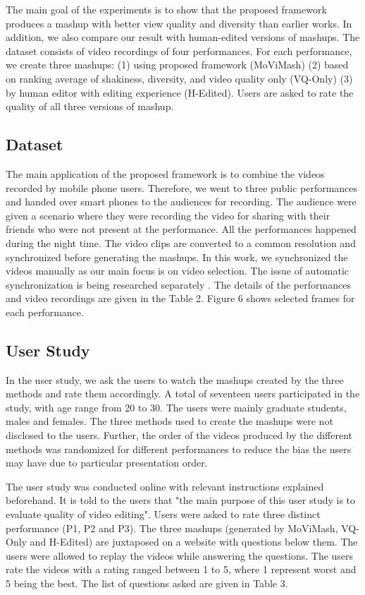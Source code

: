 \documentclass{new}
\begin{document}
The main goal of the experiments is to show that the proposed
framework produces a mashup with better view quality and diversity than earlier works. In addition, we also compare our result with
human-edited versions of mashups. The dataset consists of video
recordings of four performances. For each performance, we create three mashups: (1) using proposed framework (MoViMash) (2)
based on ranking average of shakiness, diversity, and video quality only (VQ-Only) (3) by human editor with editing experience (H-Edited). Users are asked to rate the quality of all three versions of
mashup.

\subsection{Dataset}

The main application of the proposed framework is to combine
the videos recorded by mobile phone users. Therefore, we went to
three public performances and handed over smart phones to the audiences for recording. The audience were given a scenario where
they were recording the video for sharing with their friends who
were not present at the performance. All the performances happened during the night time. The video clips are converted to a
common resolution and synchronized before generating the mashups.
In this work, we synchronized the videos manually as our main focus is on video selection. The issue of automatic synchronization is
being researched separately \cite{14}. The details of the performances
and video recordings are given in the Table 2. Figure 6 shows selected frames for each performance.

\subsection{User Study}
In the user study, we ask the users to watch the mashups created
by the three methods and rate them accordingly. A total of seventeen users participated in the study, with age range from 20 to 30.
The users were mainly graduate students, males and females. The
three methods used to create the mashups were not disclosed to the
users. Further, the order of the videos produced by the different
methods was randomized for different performances to reduce the
bias the users may have due to particular presentation order.

The user study was conducted online with relevant instructions
explained beforehand. It is told to the users that "the main purpose
of this user study is to evaluate quality of video editing". Users
were asked to rate three distinct performance (P1, P2 and P3). The
three mashups (generated by MoViMash, VQ-Only and H-Edited)
are juxtaposed on a website with questions below them. The users were allowed to replay the videos while answering the questions.
The users rate the videos with a rating ranged between 1 to 5, where
1 represent worst and 5 being the best. The list of questions asked
are given in Table 3.
\end{document}
